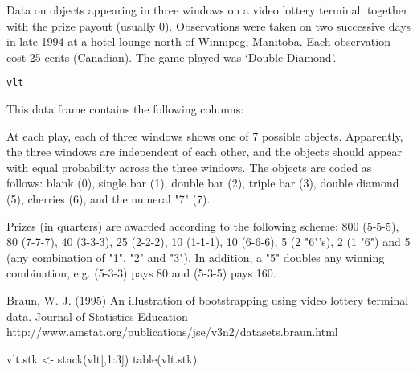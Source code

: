 \begin{Description}\relax
Data on objects appearing in three windows on a video
lottery terminal, together with the prize payout (usually 0).
Observations were taken on two successive days in late 1994
at a hotel lounge north of Winnipeg, Manitoba.  Each observation
cost 25 cents (Canadian).  The game played was `Double Diamond'.
\end{Description}
\begin{Usage}
\begin{verbatim}vlt\end{verbatim}
\end{Usage}
\begin{Format}\relax
This data frame contains the following columns:
\end{Format}
\begin{Details}\relax
At each play, each of three windows shows one of 7 possible objects.
Apparently, the three windows are independent of each other, and
the objects should appear with equal probability across the three windows.  
The objects are coded as follows: blank (0), single bar (1), double
bar (2), triple bar (3), double diamond (5), cherries (6), and 
the numeral "7" (7).  

Prizes (in quarters) are awarded according to the following scheme:  
800 (5-5-5), 80 (7-7-7), 40 (3-3-3), 25 (2-2-2), 10 (1-1-1), 10 (6-6-6),
5 (2 "6"'s), 2 (1 "6") and 5 (any combination of "1", "2" and "3").
In addition, a "5" doubles any winning combination, e.g. (5-3-3) pays
80 and (5-3-5) pays 160.
\end{Details}
\begin{Source}\relax
Braun, W. J. (1995) An illustration of bootstrapping using
video lottery terminal data.  Journal of Statistics Education
http://www.amstat.org/publications/jse/v3n2/datasets.braun.html
\end{Source}
\begin{Examples}
\begin{ExampleCode}
     vlt.stk <- stack(vlt[,1:3])
     table(vlt.stk)
\end{ExampleCode}
\end{Examples}


